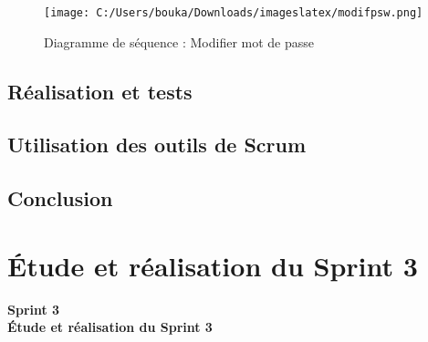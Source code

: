 \documentclass[a4paper,11pt]{report}
\begin{document}
\vspace*{\fill}  %

\begin{figure}[p]
  \centering
  \texttt{[image: C:/Users/bouka/Downloads/imageslatex/modifpsw.png]}
  \caption{Diagramme de séquence : Modifier mot de passe}
  \label{fig:modifier_mot_de_passe_plein}
\end{figure}

\vspace*{\fill}  %

\clearpage




\section{Réalisation et tests}

\section{Utilisation des outils de Scrum}

\section{Conclusion}














\newpage

\chapter{Étude et réalisation du Sprint 3}
\thispagestyle{empty}

\vspace{2cm}
\begin{center}
  {\Huge\bfseries Sprint 3}\\[0.8em]
  {\LARGE\bfseries Étude et réalisation du Sprint 3}
\end{center}
\end{document}
